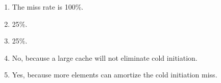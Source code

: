 \documentclass{article}
\begin{document}
\begin{enumerate}[label=\textbf{\Alph*.}]
	\item The miss rate is 100\%.
	\item 25\%.
	\item 25\%.
	\item No, because a large cache will not eliminate cold initiation.
	\item Yes, because more elements can amortize the cold initiation miss.
\end{enumerate}
\end{document}
